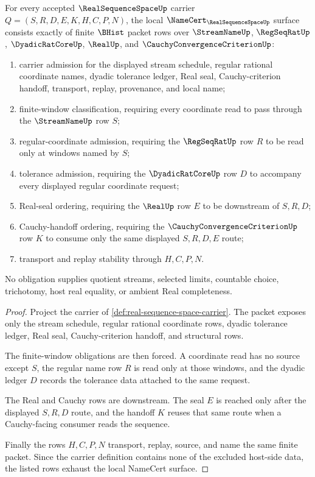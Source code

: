 \begin{theorem}
\label{thm:real-sequence-space-namecert-obligations}
For every accepted $\RealSequenceSpaceUp$ carrier $Q=(S,R,D,E,K,H,C,P,N)$, the local $\NameCert_{\RealSequenceSpaceUp}$ surface consists exactly of finite $\BHist$ packet rows over $\StreamNameUp$, $\RegSeqRatUp$, $\DyadicRatCoreUp$, $\RealUp$, and $\CauchyConvergenceCriterionUp$:
\begin{enumerate}
\item carrier admission for the displayed stream schedule, regular rational coordinate names, dyadic tolerance ledger, Real seal, Cauchy-criterion handoff, transport, replay, provenance, and local name;
\item finite-window classification, requiring every coordinate read to pass through the $\StreamNameUp$ row $S$;
\item regular-coordinate admission, requiring the $\RegSeqRatUp$ row $R$ to be read only at windows named by $S$;
\item tolerance admission, requiring the $\DyadicRatCoreUp$ row $D$ to accompany every displayed regular coordinate request;
\item Real-seal ordering, requiring the $\RealUp$ row $E$ to be downstream of $S,R,D$;
\item Cauchy-handoff ordering, requiring the $\CauchyConvergenceCriterionUp$ row $K$ to consume only the same displayed $S,R,D,E$ route;
\item transport and replay stability through $H,C,P,N$.
\end{enumerate}
No obligation supplies quotient streams, selected limits, countable choice, trichotomy, host real equality, or ambient Real completeness.
\end{theorem}
\begin{proof}
Project the carrier of \autoref{def:real-sequence-space-carrier}. The packet exposes only the stream schedule, regular rational coordinate rows, dyadic tolerance ledger, Real seal, Cauchy-criterion handoff, and structural rows.

The finite-window obligations are then forced. A coordinate read has no source except $S$, the regular name row $R$ is read only at those windows, and the dyadic ledger $D$ records the tolerance data attached to the same request.

The Real and Cauchy rows are downstream. The seal $E$ is reached only after the displayed $S,R,D$ route, and the handoff $K$ reuses that same route when a Cauchy-facing consumer reads the sequence.

Finally the rows $H,C,P,N$ transport, replay, source, and name the same finite packet. Since the carrier definition contains none of the excluded host-side data, the listed rows exhaust the local NameCert surface.
\end{proof}

